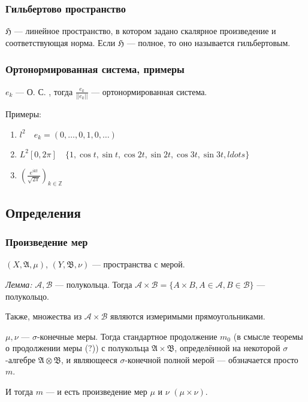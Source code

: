 \documentclass{article}
\begin{document}
\subsubsection{Гильбертово пространство}

$\mathfrak{H}$ --- линейное пространство, в котором задано скалярное произведение и соответствующая норма. Если $\mathfrak{H}$ --- полное, то оно называется гильбертовым.

\subsubsection{Ортонормированная система, примеры}

${e_k}$ --- О. С. , тогда ${\frac{e_k}{|| e_k ||}}$ --- ортонормированная система.

Примеры: 

\begin{enumerate}
    \item $l^2 \quad e_k = (0, \ldots, 0, 1, 0, \ldots)$
    \item $L^2[0, 2\pi] \quad \{1, \cos t, \sin t, \cos 2t, \sin 2t, \cos 3t, \sin 3t, ldots\}$
    \item $\left(\frac{e^{ikt}}{\sqrt{2\pi}}\right)_{k \in \mathbb{Z}}$
\end{enumerate}
\newpage

\subsection{Определения}
\subsubsection{Произведение мер}
$(X, \mathfrak{A}, \mu)$, $(Y, \mathfrak{B}, \nu)$ --- пространства с мерой.

\textit{Лемма: }
$\mathcal{A}, \mathcal{B}$ --- полукольца. Тогда $\mathcal{A} \times \mathcal{B} = \{A \times B, A \in \mathcal{A}, B \in \mathcal{B}\}$ --- полукольцо.

Также, множества из $\mathcal{A} \times \mathcal{B}$ являются измеримыми прямоугольниками.

$\mu, \nu$ --- $\sigma$-конечные меры. Тогда стандартное продолжение $m_{0}$ (в смысле теоремы о продолжении меры (?)) с полукольца $\mathfrak{A} \times \mathfrak{B}$, определённой на некоторой $\sigma$-алгебре $\mathfrak{A} \otimes \mathfrak{B}$, и являющееся $\sigma$-конечной полной мерой --- обзначается просто $m$.

И тогда $m$ --- и есть произведение мер $\mu$ и $\nu$ $(\mu \times \nu)$.
\end{document}

